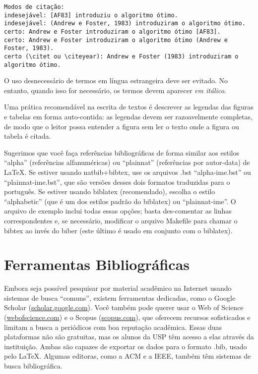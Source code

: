 \footnotesize
\begin{verbatim}
Modos de citação:
indesejável: [AF83] introduziu o algoritmo ótimo.
indesejável: (Andrew e Foster, 1983) introduziram o algoritmo ótimo.
certo: Andrew e Foster introduziram o algoritmo ótimo [AF83].
certo: Andrew e Foster introduziram o algoritmo ótimo (Andrew e Foster, 1983).
certo (\citet ou \citeyear): Andrew e Foster (1983) introduziram o algoritmo ótimo.
\end{verbatim}
\normalsize

O uso desnecessário de termos em língua estrangeira deve ser evitado. No entanto,
quando isso for necessário, os termos devem aparecer \textit{em itálico}.

Uma prática recomendável na escrita de textos é descrever as
legendas das figuras e tabelas em forma auto-contida: as
legendas devem ser razoavelmente completas, de modo que o leitor possa entender
a figura sem ler o texto onde a figura ou tabela é citada.

Sugerimos que você faça referências bibliográficas de forma similar aos
estilos ``alpha'' (referências alfanuméricas) ou ``plainnat'' (referências
por autor-data) de \LaTeX{}.  Se estiver usando natbib+bibtex,
use os arquivos .bst ``alpha-ime.bst'' ou ``plainnat-ime.bst'', que são
versões desses dois formatos traduzidas para o português. Se estiver usando
biblatex (recomendado), escolha o estilo ``alphabetic''
(que é um dos estilos padrão do biblatex) ou ``plainnat-ime''. O arquivo de
exemplo inclui todas essas opções; basta des-comentar as linhas
correspondentes e, se necessário, modificar o arquivo Makefile para chamar
o bibtex ao invés do biber (este último é usado
em conjunto com o biblatex).

\section{Ferramentas Bibliográficas}

Embora seja possível pesquisar por material acadêmico na Internet usando sistemas
de busca ``comuns'', existem ferramentas dedicadas, como o \textsf{Google Scholar}
(\url{scholar.google.com}). Você também pode querer usar o \textsf{Web of Science}
(\url{webofscience.com}) e o \textsf{Scopus} (\url{scopus.com}), que oferecem
recursos sofisticados e limitam a busca a periódicos com boa reputação acadêmica.
Essas duas plataformas não são gratuitas, mas os alunos da USP têm acesso a elas
através da instituição. Ambas são capazes de exportar os dados para o formato .bib,
usado pelo \LaTeX{}. Algumas editoras, como a ACM e a IEEE, também têm sistemas de
busca bibliográfica.

